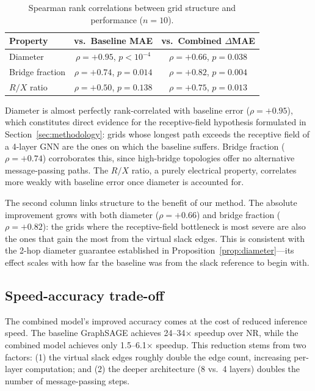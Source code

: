 \documentclass[preprint,review,12pt]{elsarticle}
\begin{document}
\begin{table}[!t]
\renewcommand{\arraystretch}{1.1}
\caption{Spearman rank correlations between grid structure and performance ($n=10$).}
\label{tab:correlations}
\centering
\begin{tabular}{lcc}
\toprule
Property & vs.\ Baseline MAE & vs.\ Combined $\Delta$MAE \\
\midrule
Diameter         & $\rho{=}{+}0.95$, $p{<}10^{-4}$ & $\rho{=}{+}0.66$, $p{=}0.038$ \\
Bridge fraction  & $\rho{=}{+}0.74$, $p{=}0.014$  & $\rho{=}{+}0.82$, $p{=}0.004$ \\
$R/X$ ratio      & $\rho{=}{+}0.50$, $p{=}0.138$  & $\rho{=}{+}0.75$, $p{=}0.013$ \\
\bottomrule
\end{tabular}
\end{table}

Diameter is almost perfectly rank-correlated with baseline error ($\rho = +0.95$), which constitutes direct evidence for the receptive-field hypothesis formulated in Section~\ref{sec:methodology}: grids whose longest path exceeds the receptive field of a 4-layer GNN are the ones on which the baseline suffers. Bridge fraction ($\rho = +0.74$) corroborates this, since high-bridge topologies offer no alternative message-passing paths. The $R/X$ ratio, a purely electrical property, correlates more weakly with baseline error once diameter is accounted for.

The second column links structure to the benefit of our method. The absolute improvement grows with both diameter ($\rho = +0.66$) and bridge fraction ($\rho = +0.82$): the grids where the receptive-field bottleneck is most severe are also the ones that gain the most from the virtual slack edges. This is consistent with the 2-hop diameter guarantee established in Proposition~\ref{prop:diameter}---its effect scales with how far the baseline was from the slack reference to begin with.

\subsection{Speed-accuracy trade-off}

The combined model's improved accuracy comes at the cost of reduced inference speed. The baseline GraphSAGE achieves 24--34$\times$ speedup over NR, while the combined model achieves only 1.5--6.1$\times$ speedup. This reduction stems from two factors: (1) the virtual slack edges roughly double the edge count, increasing per-layer computation; and (2) the deeper architecture (8 vs.\ 4 layers) doubles the number of message-passing steps.
\end{document}
